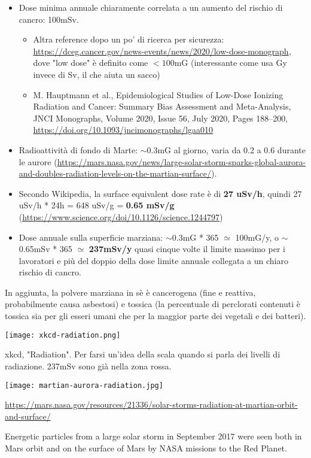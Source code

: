 \documentclass[a4paper,10pt,openany,oneside]{memoir}
\begin{document}
\begin{itemize}
  \item Dose minima annuale chiaramente correlata a un aumento del rischio di cancro: 100mSv.
  \begin{itemize}
    \item Altra reference dopo un po' di ricerca per sicurezza: \url{https://dceg.cancer.gov/news-events/news/2020/low-dose-monograph}, dove "low dose" è definito come $<100$mG (interessante come usa Gy invece di Sv, il che aiuta un sacco)
    \item M. Hauptmann et al., Epidemiological Studies of Low-Dose Ionizing Radiation and Cancer: Summary Bias Assessment and Meta-Analysis, JNCI Monographs, Volume 2020, Issue 56, July 2020, Pages 188–200, \url{https://doi.org/10.1093/jncimonographs/lgaa010}
  \end{itemize}
  \item Radioattività di fondo di Marte: $\sim$0.3mG al giorno, varia da 0.2 a 0.6 durante le aurore (\url{https://mars.nasa.gov/news/large-solar-storm-sparks-global-aurora-and-doubles-radiation-levels-on-the-martian-surface/}).
  \item Secondo Wikipedia, la surface equivalent dose rate è di \textbf{27 uSv/h}, quindi 27 uSv/h * 24h = 648 uSv/g = \textbf{0.65 mSv/g} (\url{https://www.science.org/doi/10.1126/science.1244797})
  \item Dose annuale sulla superficie marziana: $\sim$0.3mG * 365 $\simeq $ 100mG/y, o $\sim$0.65mSv * 365 $\simeq $ \textbf{237mSv/y} \textrightarrow quasi cinque volte il limite massimo per i lavoratori e più del doppio della dose limite annuale collegata a un chiaro rischio di cancro.
\end{itemize}

In aggiunta, la polvere marziana in sè è cancerogena (fine e reattiva, probabilmente causa asbestosi) e tossica (la percentuale di perclorati contenuti è tossica sia per gli esseri umani che per la maggior parte dei vegetali e dei batteri).

\texttt{[image: xkcd-radiation.png]}

xkcd, "Radiation". Per farsi un'idea della scala quando si parla dei livelli di radiazione. 237mSv sono già nella zona rossa.

\texttt{[image: martian-aurora-radiation.jpg]}

\url{https://mars.nasa.gov/resources/21336/solar-storms-radiation-at-martian-orbit-and-surface/}

Energetic particles from a large solar storm in September 2017 were seen both in Mars orbit and on the surface of Mars by NASA missions to the Red Planet.
\end{document}
